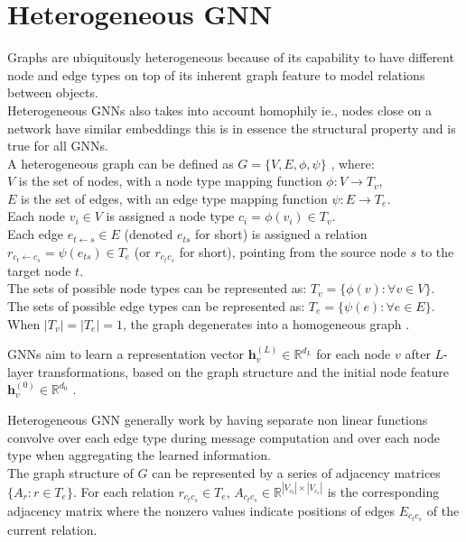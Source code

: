 \documentclass{report} %
\begin{document}
\section{Heterogeneous \ac{GNN}}\label{sec:Heterogeneous GNN}

Graphs are ubiquitously heterogeneous because of its capability to have different node and edge types on top of its inherent graph feature to model relations between objects.\\
Heterogeneous \ac{GNN}s also takes into account homophily ie., nodes close on a network have similar embeddings \cite{HGNN-2020} this is in essence the structural property and is true for all \ac{GNN}s.\\
A heterogeneous graph can be defined as \( G = \{ V, E, \phi, \psi \} \) \cite{SE HGNN-2023}, where: \\
\( V \) is the set of nodes, with a node type mapping function \( \phi : V \rightarrow T_v \), \\
\( E \) is the set of edges, with an edge type mapping function \( \psi : E \rightarrow T_e \).\\

Each node \( v_i \in V \) is assigned a node type \( c_i = \phi(v_i) \in T_v \). \cite{SE HGNN-2023}\\
Each edge \( e_{t \leftarrow s} \in E \) (denoted \( e_{ts} \) for short) is assigned a relation \( r_{c_t \leftarrow c_s} = \psi(e_{ts}) \in T_e \) (or \( r_{c_t c_s} \) for short), pointing from the source node \( s \) to the target node \( t \). \cite{SE HGNN-2023}\\

The sets of possible node types can be represented as:
\( T_v = \{ \phi(v) : \forall v \in V \} \). \\
The sets of possible edge types can be represented as:
\( T_e = \{ \psi(e) : \forall e \in E \}.\) \\
When \( |T_v| = |T_e| = 1 \), the graph degenerates into a homogeneous graph \cite{SE HGNN-2023}.

GNNs aim to learn a representation vector \( \mathbf{h}^{(L)}_v \in \mathbb{R}^{d_L} \) for each node \( v \) after \( L \)-layer transformations, 
based on the graph structure and the initial node feature \( \mathbf{h}^{(0)}_v \in \mathbb{R}^{d_0} \) \cite{REF HGNN-2021}.

Heterogeneous \ac{GNN} generally work by having separate non linear functions convolve over each edge type during message computation and over each node type when aggregating the learned information. \\
The graph structure of \( G \) can be represented by a series of adjacency matrices \(\{A_r : r \in T_e\}\). 
For each relation \(r_{c_t c_s} \in T_e\), \(A_{c_t c_s} \in \mathbb{R}^{|V_{c_t}| \times |V_{c_s}|}\) is the corresponding 
adjacency matrix where the nonzero values indicate positions of edges \(E_{c_t c_s}\) of the current relation.
\end{document}
